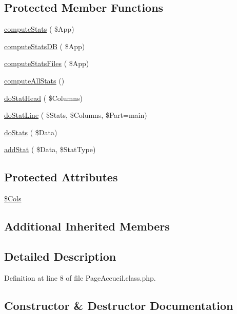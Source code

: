 \subsection*{Protected Member Functions}
\begin{DoxyCompactItemize}
\item 
\hyperlink{class_page_accueil_a98f6fc9d30fc6ce0e44230887a2f2958}{compute\+Stats} ( \$App)
\item 
\hyperlink{class_page_accueil_a9799218ddbc6dcdbc471e2a99efbe61a}{compute\+Stats\+DB} ( \$App)
\item 
\hyperlink{class_page_accueil_a53981e78427397fc56ec11e28d8f0bd3}{compute\+Stats\+Files} ( \$App)
\item 
\hyperlink{class_page_accueil_a4acc4c64a5b79fd4d0f12ccbeeabe83e}{compute\+All\+Stats} ()
\item 
\hyperlink{class_page_accueil_afe6329de30c9e7b68b5a636b096928d0}{do\+Stat\+Head} ( \$Columns)
\item 
\hyperlink{class_page_accueil_a4350b2f1c419b669294b5dc89c6e3568}{do\+Stat\+Line} ( \$Stats, \$Columns, \$Part=\textquotesingle{}main\textquotesingle{})
\item 
\hyperlink{class_page_accueil_ac3d7722a9e10fe717e07f5e30550f3a3}{do\+Stats} ( \$Data)
\item 
\hyperlink{class_page_accueil_a32d82822c35bdbac485363e5f6b95418}{add\+Stat} ( \$Data, \$Stat\+Type)
\end{DoxyCompactItemize}
\subsection*{Protected Attributes}
\begin{DoxyCompactItemize}
\item 
\hyperlink{class_page_accueil_aed778338aeedd936d8e5e48bdf1be538}{\$\+Cols}
\end{DoxyCompactItemize}
\subsection*{Additional Inherited Members}


\subsection{Detailed Description}


Definition at line 8 of file Page\+Accueil.\+class.\+php.



\subsection{Constructor \& Destructor Documentation}
\mbox{\label{class_page_accueil_a94778509e719e4a7620440be3b76f986}} 
